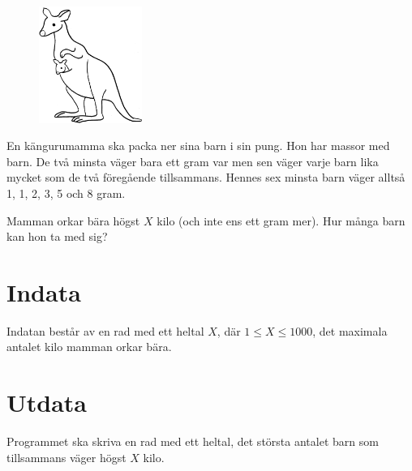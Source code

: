 
\begin{figure}[!h]
\begin{center}
\includegraphics[width=0.3\textwidth]{kangaroo.png} 
\end{center}
\end{figure}

En kängurumamma ska packa ner sina barn i sin pung. Hon har massor med
barn. De två minsta väger bara ett gram var men sen väger varje barn
lika mycket som de två föregående tillsammans. Hennes sex minsta barn
väger alltså 1, 1, 2, 3, 5 och 8 gram.

Mamman orkar bära högst $X$ kilo (och inte ens ett gram mer). Hur många barn kan hon ta med sig?

\section*{Indata}

Indatan består av en rad med ett heltal $X$, där $1\le X \le 1000$, det
maximala antalet kilo mamman orkar bära.

\section*{Utdata}

Programmet ska skriva en rad med ett heltal, det största antalet barn
som tillsammans väger högst $X$ kilo.
